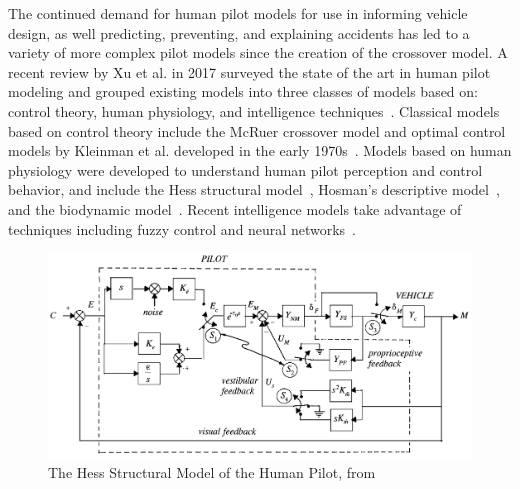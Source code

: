 \documentclass[float=false, crop=false]{standalone}
\begin{document}
The continued demand for human pilot models for use in informing vehicle design, as well predicting, preventing, and explaining accidents has led to a variety of more complex pilot models since the creation of the crossover model.
A recent review by Xu et al. in 2017 surveyed the state of the art in human pilot modeling and grouped existing models into three classes of models based on: control theory, human physiology, and intelligence techniques~\cite{Xu2017}.
Classical models based on control theory include the McRuer crossover model and optimal control models by Kleinman et al. developed in the early 1970s~\cite{Kleinman1970, Baron1970}.
Models based on human physiology were developed to understand human pilot perception and control behavior, and include the Hess structural model~\cite{Hess1980, Hess1990, Hess1997}, Hosman's descriptive model~\cite{Hosman1996, Hosman1999}, and the biodynamic model~\cite{Griffin2001}.
Recent intelligence models take advantage of techniques including fuzzy control and neural networks~\cite{Zaychik2006, Gestwa}.

\begin{figure}[tb!]
    \begin{center}
        \includegraphics[width=0.8\linewidth]{./../img/Screen Shot 2018-07-31 at 11.21.44 AM.png}
        \caption{The Hess Structural Model of the Human Pilot, from~\cite{Hess1997}}
        \label{figure:structuralmodel}
    \end{center}
\end{figure}
\end{document}
